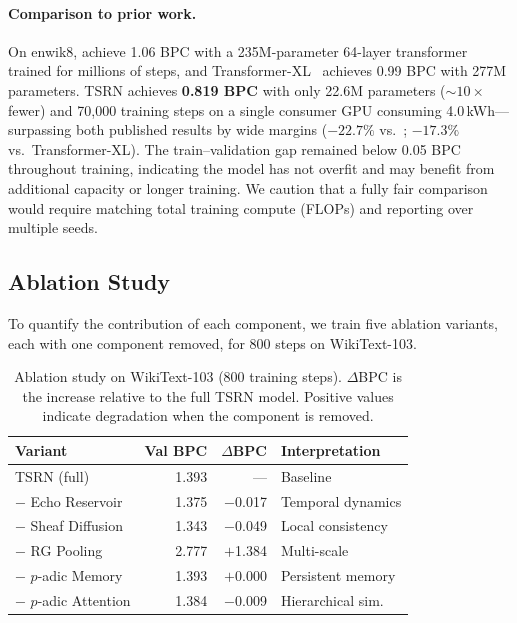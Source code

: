 \documentclass[11pt,a4paper]{article}
\begin{document}
\paragraph{Comparison to prior work.}
On enwik8, \citet{al2019character} achieve 1.06 BPC with a
235M-parameter 64-layer transformer trained for millions of steps, and
Transformer-XL~\citep{dai2019transformerxl} achieves 0.99 BPC with
277M parameters.  TSRN achieves \textbf{0.819 BPC} with only 22.6M
parameters ($\sim\!10\times$ fewer) and 70{,}000 training steps on a
single consumer GPU consuming 4.0\,kWh---surpassing both published
results by wide margins ($-22.7\%$ vs.\ \citeauthor{al2019character};
$-17.3\%$ vs.\ Transformer-XL).  The train--validation gap remained
below 0.05 BPC throughout training, indicating the model has not
overfit and may benefit from additional capacity or longer training.
We caution that a fully fair comparison would require matching total
training compute (FLOPs) and reporting over multiple seeds.

\subsection{Ablation Study}
\label{sec:ablation}

To quantify the contribution of each component, we train five
ablation variants, each with one component removed, for 800 steps on
WikiText-103.

\begin{table}[t]
\centering
\caption{Ablation study on WikiText-103 (800 training steps).
  $\Delta$BPC is the increase relative to the full TSRN model.
  Positive values indicate degradation when the component is removed.}
\label{tab:ablation}
\begin{tabular}{lrrl}
\toprule
\textbf{Variant} & \textbf{Val BPC} & \textbf{$\Delta$BPC} &
  \textbf{Interpretation} \\
\midrule
TSRN (full)           & 1.393 & ---      & Baseline \\
$-$ Echo Reservoir    & 1.375 & $-$0.017 & Temporal dynamics \\
$-$ Sheaf Diffusion   & 1.343 & $-$0.049 & Local consistency \\
$-$ RG Pooling        & 2.777 & $+$1.384 & Multi-scale \\
$-$ $p$-adic Memory   & 1.393 & $+$0.000 & Persistent memory \\
$-$ $p$-adic Attention& 1.384 & $-$0.009 & Hierarchical sim. \\
\bottomrule
\end{tabular}
\end{table}
\end{document}
